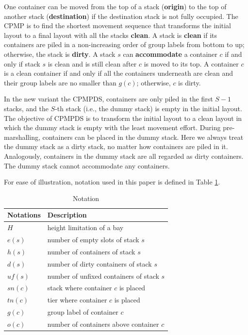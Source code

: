 \documentclass[review,3p,times,authoryear,12pt]{elsarticle}
\begin{document}
One container can be moved from the top of a stack (\textbf{origin}) to the top of another stack (\textbf{destination}) if the destination stack is not fully occupied.
The CPMP is to find the shortest movement sequence that transforms the initial layout to a final layout with all the stacks \textbf{clean}. 
A stack is \textbf{clean} if its containers are piled in a non-increasing order of group labels from bottom to up; otherwise, the stack is \textbf{dirty}. 
A stack $s$ can \textbf{accommodate} a container $c$ if and only if stack $s$ is clean and is still clean after $c$ is moved to its top.
A container $c$ is a clean container if and only if all the containers underneath are clean and their group labels are no smaller than $g(c)$; otherwise, $c$ is dirty.


In the new variant the CPMPDS, containers are only piled in the first $S-1$ stacks, and the $S$-th stack (i.e., the dummy stack) is empty in the initial layout. 
The objective of CPMPDS is to transform the initial layout to a clean layout in which the dummy stack is empty with the least movement effort.
During pre-marshalling, containers can be placed in the dummy stack. 
Here we always treat the dummy stack as a dirty stack, no matter how containers are piled in it.
Analogously, containers in the dummy stack are all regarded as dirty containers.
The dummy stack cannot accommodate any containers.

For ease of illustration, notation used in this paper is defined in Table \ref{tab:1}.

\begin{table}[!htb]
  \centering
  \caption{Notation}
  \label{tab:1}
    \begin{tabular}{l|l}
    \hline
    Notations         & Description \\
    \hline
    $H$               &  height limitation of a bay\\
    $e(s)$            &  number of empty slots of stack $s$\\
    $h(s)$            &  number of containers of stack $s$\\
    $d(s)$            &  number of dirty containers of stack $s$\\
    $\mathit{uf}(s)$      &  number of unfixed containers of stack $s$\\
    $\mathit{sn}(c)$      &  stack where container $c$ is placed\\
    $\mathit{tn}(c)$      &  tier where container $c$ is placed\\
    $g(c)$            &  group label of container $c$\\
    $o(c)$          &  number of containers above container $c$\\
    \hline
    \end{tabular}
\end{table}
\end{document}
